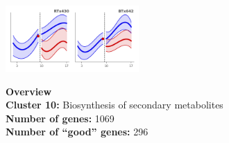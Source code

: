 \begin{multicols}{2}
\includegraphics[width=2in]{figures/clusters/leaf_Postflowering_9.png}
\columnbreak

\noindent \textbf{Overview}\\\textbf{Cluster 10:} Biosynthesis of secondary metabolites \\
\textbf{Number of genes:} 1069 \\
\textbf{Number of ``good'' genes:} 296 \\
\end{multicols}

